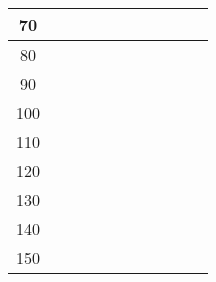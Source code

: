 \documentclass[a4paper,12pt]{article} %
\begin{document}
\begin{table}[h]
\begin{tabular}{|c|l|l|l|l|l|l|l|l|l|l|}
70      &                        &                        &                        &                        &                        &                        &                        &                        &                        &                         \\ \hline
80      &                        &                        &                        &                        &                        &                        &                        &                        &                        &                         \\ \hline
90      &                        &                        &                        &                        &                        &                        &                        &                        &                        &                         \\ \hline
100     &                        &                        &                        &                        &                        &                        &                        &                        &                        &                         \\ \hline
110     &                        &                        &                        &                        &                        &                        &                        &                        &                        &                         \\ \hline
120     &                        &                        &                        &                        &                        &                        &                        &                        &                        &                         \\ \hline
130     &                        &                        &                        &                        &                        &                        &                        &                        &                        &                         \\ \hline
140     &                        &                        &                        &                        &                        &                        &                        &                        &                        &                         \\ \hline
150     &                        &                        &                        &                        &                        &                        &                        &                        &                        &                         \\ \hline

\end{tabular}
\end{table}
\end{document}
